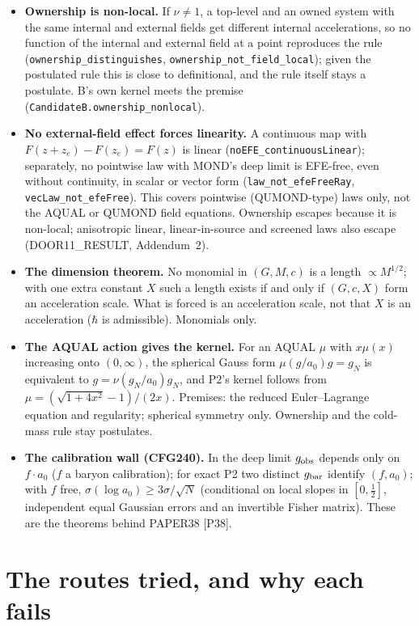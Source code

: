 \documentclass[10pt]{article}
\begin{document}
\begin{itemize}
\item \textbf{Ownership is non-local.} If $\nu\ne1$, a top-level and an owned system with the same internal and external fields get different internal accelerations, so no function of the internal and external field at a point reproduces the rule (\texttt{ownership\_distinguishes}, \texttt{ownership\_not\_field\_local}); given the postulated rule this is close to definitional, and the rule itself stays a postulate. B's own kernel meets the premise (\texttt{CandidateB.ownership\_nonlocal}).
\item \textbf{No external-field effect forces linearity.} A continuous map with $F(z+z_e)-F(z_e)=F(z)$ is linear (\texttt{noEFE\_continuousLinear}); separately, no pointwise law with MOND's deep limit is EFE-free, even without continuity, in scalar or vector form (\texttt{law\_not\_efeFreeRay}, \texttt{vecLaw\_not\_efeFree}). This covers pointwise (QUMOND-type) laws only, not the AQUAL or QUMOND field equations. Ownership escapes because it is non-local; anisotropic linear, linear-in-source and screened laws also escape (DOOR11\_RESULT, Addendum~2).
\item \textbf{The dimension theorem.} No monomial in $(G,M,c)$ is a length $\propto M^{1/2}$; with one extra constant $X$ such a length exists if and only if $(G,c,X)$ form an acceleration scale. What is forced is an acceleration scale, not that $X$ is an acceleration ($\hbar$ is admissible). Monomials only.
\item \textbf{The AQUAL action gives the kernel.} For an AQUAL $\mu$ with $x\mu(x)$ increasing onto $(0,\infty)$, the spherical Gauss form $\mu(g/a_0)g=g_N$ is equivalent to $g=\nu(g_N/a_0)g_N$, and P2's kernel follows from $\mu=(\sqrt{1+4x^2}-1)/(2x)$. Premises: the reduced Euler--Lagrange equation and regularity; spherical symmetry only. Ownership and the cold-mass rule stay postulates.
\item \textbf{The calibration wall (CFG240).} In the deep limit $g_{\rm obs}$ depends only on $f\cdot a_0$ ($f$ a baryon calibration); for exact P2 two distinct $g_{\rm bar}$ identify $(f,a_0)$; with $f$ free, $\sigma(\log a_0)\ge3\sigma/\sqrt N$ (conditional on local slopes in $[0,\tfrac12]$, independent equal Gaussian errors and an invertible Fisher matrix). These are the theorems behind PAPER38 [P38].
\end{itemize}

\section{The routes tried, and why each fails}\label{sec:doors}
\end{document}
